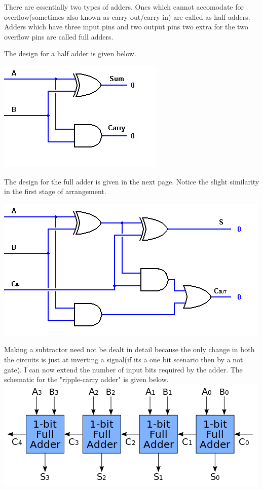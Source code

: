 \documentclass[11pt]{article}
\begin{document}
There are essentially two types of adders. Ones which cannot accomodate for overflow(sometimes also known as carry out/carry in) are called as half-adders. Adders which have three input pins and two output pins two extra for the two overflow pins are called full adders.

The design for a half adder is given below.




\includegraphics[scale=1.15]{Half-Adder-Circuit.png}

The design for the full adder is given in the next page. Notice the slight similarity in the first stage of arrangement.

\includegraphics[scale=1]{Full-Adder-Circuit.png}



Making a subtractor need not be dealt in detail because the only change in both the circuits is just at inverting a signal(if its a one bit scenario then by a not gate). I can now extend the number of input bits required by the adder. The schematic for the "ripple-carry adder" is given below.
\includegraphics[scale=0.75]{rca.png}
\end{document}
